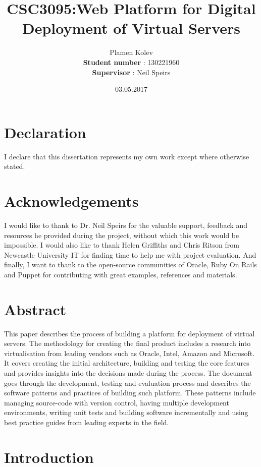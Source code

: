 \documentclass{article}
\title{CSC3095:Web Platform for Digital Deployment of Virtual Servers}
\date{03.05.2017}
\author{Plamen Kolev\\ \textbf{Student number} : 130221960\\ \textbf{Supervisor} : Neil Speirs}
\begin{document}
\maketitle

\newpage
\section{Declaration}
I declare that this dissertation represents my own work except where otherwise stated.

\section{Acknowledgements}
I would like to thank to Dr. Neil Speirs for the valuable support, feedback and resources he provided during the project, without which this work would be impossible. I would also like to thank  Helen Griffiths and Chris Ritson from Newcastle University IT for finding time to help me with project evaluation.  And finally, I want to thank to the open-source communities of Oracle, Ruby On Rails and Puppet for contributing with great examples, references and materials. 

\newpage
\section{Abstract}

This paper describes the process of building a platform for deployment of virtual servers. The methodology for creating the final product includes a research into virtualisation from leading vendors such as Oracle, Intel, Amazon and Microsoft. It covers creating the initial architecture, building and testing the core features and provides insights into the decisions made during the process. The document goes through the development, testing and evaluation process and describes the software patterns and practices of building such platform. These patterns include managing source-code with version control, having multiple development environments, writing unit tests and building software incrementally and using best practice guides from leading experts in the field.

\newpage
\tableofcontents
\newpage
\listoffigures
\newpage
{}

\newpage
\section{Introduction}
\end{document}
